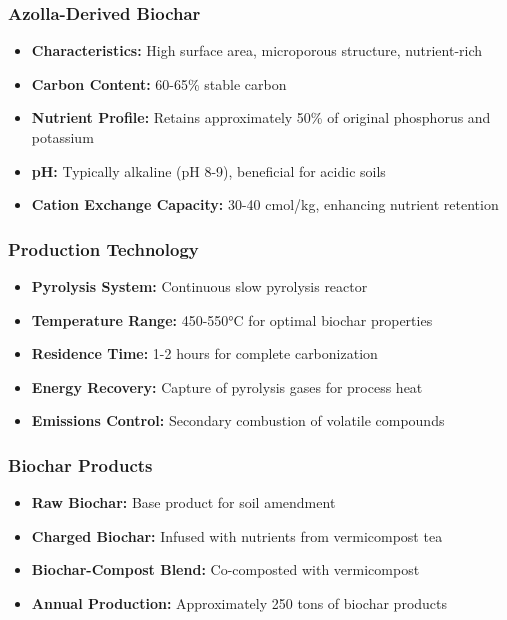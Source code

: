 \subsubsection{Azolla-Derived Biochar}
\begin{itemize}
    \item \textbf{Characteristics:} High surface area, microporous structure, nutrient-rich
    \item \textbf{Carbon Content:} 60-65\% stable carbon
    \item \textbf{Nutrient Profile:} Retains approximately 50\% of original phosphorus and potassium
    \item \textbf{pH:} Typically alkaline (pH 8-9), beneficial for acidic soils
    \item \textbf{Cation Exchange Capacity:} 30-40 cmol/kg, enhancing nutrient retention
\end{itemize}

\subsubsection{Production Technology}
\begin{itemize}
    \item \textbf{Pyrolysis System:} Continuous slow pyrolysis reactor
    \item \textbf{Temperature Range:} 450-550°C for optimal biochar properties
    \item \textbf{Residence Time:} 1-2 hours for complete carbonization
    \item \textbf{Energy Recovery:} Capture of pyrolysis gases for process heat
    \item \textbf{Emissions Control:} Secondary combustion of volatile compounds
\end{itemize}

\subsubsection{Biochar Products}
\begin{itemize}
    \item \textbf{Raw Biochar:} Base product for soil amendment
    \item \textbf{Charged Biochar:} Infused with nutrients from vermicompost tea
    \item \textbf{Biochar-Compost Blend:} Co-composted with vermicompost
    \item \textbf{Annual Production:} Approximately 250 tons of biochar products
\end{itemize}

